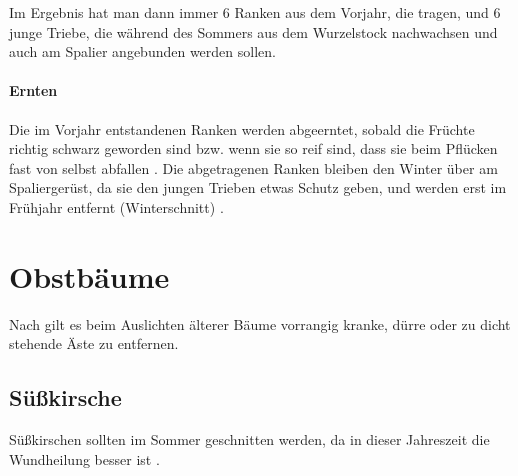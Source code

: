 Im Ergebnis hat man dann immer 6 Ranken aus dem Vorjahr, die tragen, und 6 junge Triebe, die während des Sommers aus dem Wurzelstock nachwachsen und auch am Spalier angebunden werden sollen.

\paragraph{Ernten}

Die im Vorjahr entstandenen Ranken werden abgeerntet, sobald die Früchte richtig schwarz geworden sind bzw. wenn sie so reif sind, dass sie beim Pflücken fast von selbst abfallen \citep[S.~176]{Seymour1978}.
Die abgetragenen Ranken bleiben den Winter über am Spaliergerüst, da sie den jungen Trieben etwas Schutz geben, und werden erst im Frühjahr entfernt (\textrightarrow Winterschnitt) \citep[S.~197]{Stangl1995}.

\vfill
\pagebreak

\section{Obstbäume}
\label{Bäume}

Nach \citet[S.~256]{Stangl1995} gilt es beim Auslichten älterer Bäume vorrangig kranke, dürre oder zu dicht stehende Äste zu entfernen.

\subsection{Süßkirsche}
\label{Süßkirsche}

Süßkirschen sollten im Sommer geschnitten werden, da in dieser Jahreszeit die Wundheilung besser ist \citep[S.~109]{Heberer2018}.

\vfill

\pagebreak